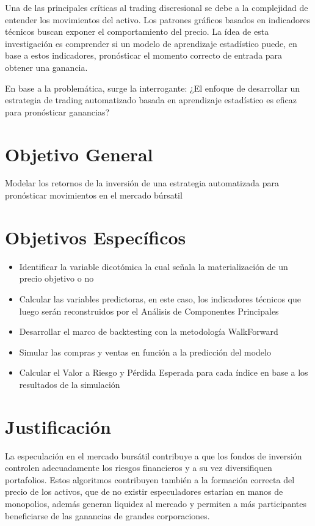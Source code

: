\documentclass[a4paper,12pt]{Latex/Classes/PhDthesisPSnPDF}
\begin{document}
Una de las principales críticas al trading discresional se debe a la complejidad de entender los movimientos del activo. Los patrones gráficos basados en indicadores técnicos buscan exponer el comportamiento del precio. La ídea de esta investigación es comprender si un modelo de aprendizaje estadístico puede, en base a estos indicadores, pronósticar el momento correcto de entrada para obtener una ganancia.

En base a la problemática, surge la interrogante: ¿El enfoque de desarrollar un estrategia de trading automatizado basada en aprendizaje estadístico es eficaz para pronósticar ganancias?

\section{Objetivo General}

Modelar los retornos de la inversión de una estrategia automatizada para pronósticar movimientos en el mercado búrsatil

\section{Objetivos Específicos}

\begin{itemize}
\item Identificar la variable dicotómica la cual señala la materialización de un precio objetivo o no
\item Calcular las variables predictoras, en este caso, los indicadores técnicos que luego serán reconstruidos por el Análisis de Componentes Principales
\item Desarrollar el marco de backtesting con la metodología WalkForward
\item Simular las compras y ventas en función a la predicción del modelo 
\item Calcular el Valor a Riesgo y Pérdida Esperada para cada índice en base a los resultados de la simulación
\end{itemize}

\section{Justificación}

La especulación en el mercado bursátil contribuye a que los fondos de inversión controlen adecuadamente los riesgos financieros y a su vez diversifiquen portafolios. Estos algoritmos contribuyen también a la formación correcta del precio de los activos, que de no existir especuladores estarían en manos de monopolios, además generan liquidez al mercado y permiten a más participantes beneficiarse de las ganancias de grandes corporaciones.
\end{document}

